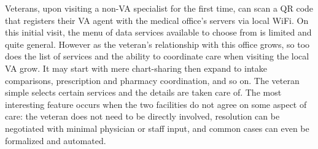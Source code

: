 %
%
%

Veterans, upon visiting a non-VA specialist for the first time, can scan a QR code that registers their \projectName VA agent with the medical office's servers via local WiFi. On this initial visit, the menu of data services available to choose from is limited and quite general.
However as the veteran's relationship with this office grows, so too does the list of services and the ability to coordinate care when visiting the local VA grow.
It may start with mere chart-sharing then expand to intake comparisons, prescription and pharmacy coordination, and so on.
The veteran simple selects certain services and the details are taken care of.
The most interesting feature occurs when the two facilities do not agree on some aspect of care: the veteran does not need to be directly involved, resolution can be negotiated with minimal physician or staff input, and common cases can even be formalized and automated.
